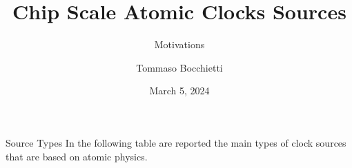 \documentclass[10pt]{beamer}
\title{Chip Scale Atomic Clocks Sources}
\subtitle{Motivations}
\date{March 5, 2024}
\author{Tommaso Bocchietti}
\institute{University of Waterloo}
\begin{document}
\maketitle

\begin{frame}[fragile]{Source Types}
    In the following table are reported the main types of clock sources that are based on atomic physics.
    \begin{table}



\end{table}
\end{frame}
\end{document}
